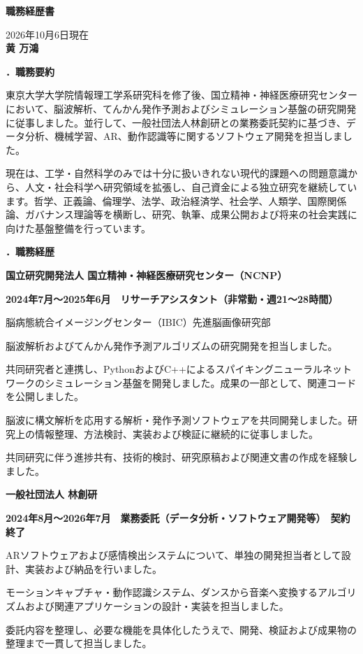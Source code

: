 \documentclass[10.5pt,a4paper]{article}
\newcommand{\MajorSection}[1]{%
  \par\vspace{0.85em}%
  {\minchofont\bfseries\fontsize{12.2pt}{15pt}\selectfont #1}\par
  \vspace{0.32em}%
}
\newcommand{\Institution}[1]{%
  \par\vspace{0.55em}%
  {\minchofont\bfseries\fontsize{11.2pt}{14pt}\selectfont #1}\par
  \vspace{0.1em}%
}
\newcommand{\RoleLine}[1]{%
  {\minchofont\bfseries #1}\par\vspace{0.08em}%
}
\begin{document}
\begin{center}
  {\minchofont\bfseries\fontsize{18pt}{22pt}\selectfont 職務経歴書}
\end{center}

\vspace{0.3em}
\begin{flushright}
2026年10月6日現在\\
{\bfseries 黄 万鴻}
\end{flushright}

\MajorSection{1．職務要約}
東京大学大学院情報理工学系研究科を修了後、国立精神・神経医療研究センターにおいて、脳波解析、てんかん発作予測およびシミュレーション基盤の研究開発に従事しました。並行して、一般社団法人林創研との業務委託契約に基づき、データ分析、機械学習、AR、動作認識等に関するソフトウェア開発を担当しました。

現在は、工学・自然科学のみでは十分に扱いきれない現代的課題への問題意識から、人文・社会科学へ研究領域を拡張し、自己資金による独立研究を継続しています。哲学、正義論、倫理学、法学、政治経済学、社会学、人類学、国際関係論、ガバナンス理論等を横断し、研究、執筆、成果公開および将来の社会実践に向けた基盤整備を行っています。

\MajorSection{2．職務経歴}

\Institution{国立研究開発法人 国立精神・神経医療研究センター（NCNP）}
\RoleLine{2024年7月～2025年6月　リサーチアシスタント（非常勤・週21～28時間）}
脳病態統合イメージングセンター（IBIC）先進脳画像研究部

\begin{formalitems}
\item 脳波解析およびてんかん発作予測アルゴリズムの研究開発を担当しました。
\item 共同研究者と連携し、PythonおよびC++によるスパイキングニューラルネットワークのシミュレーション基盤を開発しました。成果の一部として、関連コードを公開しました。
\item 脳波に構文解析を応用する解析・発作予測ソフトウェアを共同開発しました。研究上の情報整理、方法検討、実装および検証に継続的に従事しました。
\item 共同研究に伴う進捗共有、技術的検討、研究原稿および関連文書の作成を経験しました。
\end{formalitems}

\Institution{一般社団法人 林創研}
\RoleLine{2024年8月～2026年7月　業務委託（データ分析・ソフトウェア開発等）　契約終了}

\begin{formalitems}
\item ARソフトウェアおよび感情検出システムについて、単独の開発担当者として設計、実装および納品を行いました。
\item モーションキャプチャ・動作認識システム、ダンスから音楽へ変換するアルゴリズムおよび関連アプリケーションの設計・実装を担当しました。
\item 委託内容を整理し、必要な機能を具体化したうえで、開発、検証および成果物の整理まで一貫して担当しました。
\end{formalitems}
\end{document}
